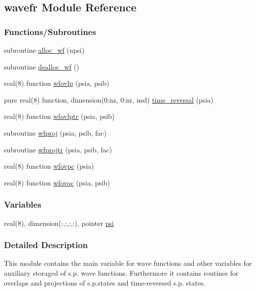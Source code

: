 \hypertarget{namespacewavefr}{}\subsection{wavefr Module Reference}
\label{namespacewavefr}
\subsubsection*{Functions/\+Subroutines}
\begin{DoxyCompactItemize}
\item 
subroutine \hyperlink{namespacewavefr_a82c6a57af65c62f9fba38b7eeb46ca8f}{alloc\+\_\+wf} (npsi)
\item 
subroutine \hyperlink{namespacewavefr_a569f9e92e926f1a2f7b5a9c8efb2907e}{dealloc\+\_\+wf} ()
\item 
real(8) function \hyperlink{namespacewavefr_a10dc27c35fdb4656b839f63dbc1ccb38}{wfovlp} (psia, psib)
\item 
pure real(8) function, dimension(0\+:nz, 0\+:nr, nsd) \hyperlink{namespacewavefr_a6941c11e1d1f594c22032dee72d5c67a}{time\+\_\+reversal} (psia)
\item 
real(8) function \hyperlink{namespacewavefr_aead2efe9f9e481e6a594c93871cce730}{wfovlptr} (psia, psib)
\item 
subroutine \hyperlink{namespacewavefr_a519281578e3b01a8650657a2ced55e8a}{wfproj} (psia, psib, fac)
\item 
subroutine \hyperlink{namespacewavefr_a0c4c5f764c196fe4b005f62e9369a1b0}{wfprojtr} (psia, psib, fac)
\item 
real(8) function \hyperlink{namespacewavefr_a3d95d1d937626dca97d24be282442950}{wfovpc} (psia)
\item 
real(8) function \hyperlink{namespacewavefr_a82a49ad95ae89423187333e2c1899e4f}{wfovoc} (psia, psib)
\end{DoxyCompactItemize}
\subsubsection*{Variables}
\begin{DoxyCompactItemize}
\item 
real(8), dimension(\+:,\+:,\+:,\+:), pointer \hyperlink{namespacewavefr_a52b30de869aa8a41afeacaca1874f0f8}{psi}
\end{DoxyCompactItemize}


\subsubsection{Detailed Description}
This module contains the main variable for wave functions and other variables for auxiliary storaged of s.\+p. wave functions. Furthermore it contains routines for overlaps and projections of s.\+p.\+states and time-\/reversed s.\+p. states. 

